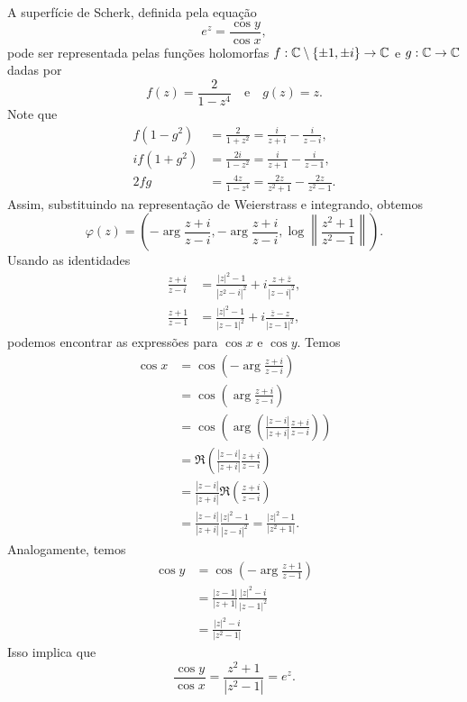\begin{exemplo}
	A superfície de Scherk, definida pela equação
	\begin{equation*}
	e^z = \frac{\cos y}{\cos x},
	\end{equation*}
	pode ser representada pelas funções holomorfas $f: \mathbb{C} \setminus \{\pm 1, \pm i \} \rightarrow \mathbb{C}$ e $g: \mathbb{C} \rightarrow \mathbb{C}$ dadas por
	\begin{equation*}
	f(z) = \frac{2}{1 - z^4} \quad \text{e} \quad
	g(z) = z.
	\end{equation*}
	Note que
	\begin{align*}
	f (1 - g^2) &= \frac{2}{1 + z^2} = \frac{i}{z + i} - \frac{i}{z - i}, \\
	i f (1 + g^2) &= \frac{2i}{1 - z^2} = \frac{i}{z + 1} - \frac{i}{z - 1}, \\
	2fg &= \frac{4z}{1 - z^4} = \frac{2z}{z^2 + 1} - \frac{2z}{z^2 - 1}.
	\end{align*}
	Assim, substituindo na representação de Weierstrass e integrando, obtemos
	\begin{equation*}
	\varphi(z) = \left( -\arg \frac{z + i}{z - i}, -\arg \frac{z + i}{z - i}, \log \left\| \frac{z^2 + 1}{z^2 - 1} \right\| \right).
	\end{equation*}
	Usando as identidades
	\begin{align*}
	\frac{z + i}{z - i} &= \frac{|z|^2 - 1}{|z^2 - i|^2} + i \frac{z + \overline{z}}{|z - i|^2}, \\
	\frac{z + 1}{z - 1} &= \frac{|z|^2 - 1}{|z - 1|^2} + i \frac{\overline{z} - z}{|z - 1|^2},
	\end{align*}
	podemos encontrar as expressões para $\cos x$ e $\cos y$. Temos
	\begin{align*}
	\cos x &= \cos \left( -\arg \frac{z + i}{z - i} \right) \\
	&= \cos \left( \arg \frac{z + i}{z - i} \right) \\
	&= \cos \left( \arg \left( \frac{|z - i|}{|z + i|} \frac{z + i}{z - i} \right) \right) \\
	&= \Re \left( \frac{|z - i|}{|z + i|} \frac{z + i}{z - i} \right) \\
	&= \frac{|z - i|}{|z + i|} \Re \left( \frac{z + i}{z - i} \right) \\
	&= \frac{|z - i|}{|z + i|} \frac{|z|^2 - 1}{|z - i|^2} = \frac{|z|^2 - 1}{|z^2 + 1|}.
	\end{align*}
	Analogamente, temos
	\begin{align*}
	\cos y &= \cos \left( -\arg \frac{z + 1}{z - 1} \right) \\
	&= \frac{|z - 1|}{|z + 1|} \frac{|z|^2 - i}{|z - 1|^2} \\
	&= \frac{|z|^2 - i}{|z^2 - 1|}
	\end{align*}
	Isso implica que
	\begin{equation*}
	\frac{\cos y}{\cos x} = \frac{z^2 + 1}{|z^2 - 1|} = e^z.
	\end{equation*}
	

\end{exemplo}
